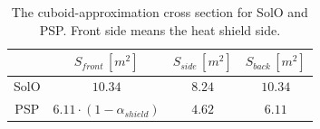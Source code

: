 \begin{table}[b]
\caption{The cuboid-approximation cross section for SolO and PSP. Front side means the heat shield side.}
\centering
\label{tab:cross_section}
\begin{tabular}{c|ccc}
\multicolumn{1}{p{1.2cm}}{  } \vline &  
\multicolumn{1}{p{3cm}}{ \centering $S_{front} \, [m^2]$ } & 
\multicolumn{1}{p{2cm}}{ \centering $S_{side} \, [m^2]$} & 
\multicolumn{1}{p{2cm}}{ \centering $S_{back} \, [m^2]$} \\
\hline
SolO & $10.34$ & $8.24$ & $10.34$   \\
PSP & $6.11 \cdot (1-\alpha_{shield})$ & $4.62$ & $6.11$  \\
\hline
\end{tabular}
\end{table}


